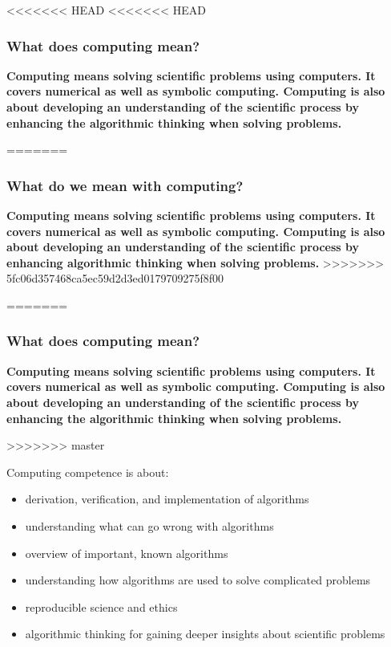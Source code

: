 \documentclass{beamer}
\begin{document}
\begin{frame}
<<<<<<< HEAD
<<<<<<< HEAD
\frametitle{What does computing mean?}

\begin{block}{}

\textbf{Computing means solving scientific problems using computers. It covers numerical as well as symbolic computing. Computing is also about developing an understanding of the scientific process by enhancing the algorithmic thinking when solving problems.}
\end{block}
=======
\frametitle{What do we mean with computing?}

\begin{block}{}

\textbf{Computing means solving scientific problems using computers. It covers numerical as well as symbolic computing. Computing is also about developing an understanding of the scientific process by enhancing algorithmic thinking when solving problems.}
>>>>>>> 5fc06d357468ca5ec59d2d3ed0179709275f8f00

=======
\frametitle{What does computing mean?}

\begin{block}{}

\textbf{Computing means solving scientific problems using computers. It covers numerical as well as symbolic computing. Computing is also about developing an understanding of the scientific process by enhancing the algorithmic thinking when solving problems.}
\end{block}
>>>>>>> master

\begin{block}{Computing competence is about: }

\begin{itemize}
\item derivation, verification, and implementation of algorithms

\item understanding what can go wrong with algorithms

\item overview of important, known algorithms

\item understanding how algorithms are used to solve complicated problems

\item reproducible science and ethics

\item algorithmic thinking for gaining deeper insights about scientific problems
\end{itemize}


\end{block}
\end{block}
\end{frame}
\end{document}

